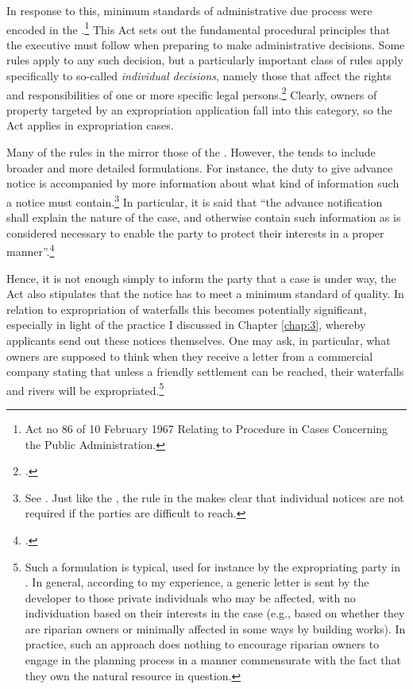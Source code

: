 In response to this, minimum standards of administrative due process were encoded in the \cite{paa67}.\footnote{Act no 86 of 10 February 1967 Relating to Procedure in Cases Concerning the Public Administration.} This Act sets out the fundamental procedural principles that the executive must follow when preparing to make administrative decisions. Some rules apply to any such decision, but a particularly important class of rules apply specifically to so-called {\it individual decisions}, namely those that affect the rights and responsibilities of one or more specific legal persons.\footcite[2]{paa67} Clearly, owners of property targeted by an expropriation application fall into this category, so the Act applies in expropriation cases.

Many of the rules in the \cite{paa67} mirror those of the \cite{ea59}. However, the \cite{paa67} tends to include broader and more detailed formulations. For instance, the duty to give advance notice is accompanied by more information about what kind of information such a notice must contain.\footnote{See \cite[16]{paa67}. Just like the \cite{ea59}, the rule in the \cite{paa67} makes clear that individual notices are not required if the parties are difficult to reach.} In particular, it is said that ``the advance notification shall explain the nature of the case, and otherwise contain such information as is considered necessary to enable the party to protect their interests in a proper manner''.\footcite[16]{paa67} 

Hence, it is not enough simply to inform the party that a case is under way, the Act also stipulates that the notice has to meet a minimum standard of quality. In relation to expropriation of waterfalls this becomes potentially significant, especially in light of the practice I discussed in Chapter \ref{chap:3}, whereby applicants send out these notices themselves. One may ask, in particular, what owners are supposed to think when they receive a letter from a commercial company stating that unless a friendly settlement can be reached, their waterfalls and rivers will be expropriated.\footnote{Such a formulation is typical, used for instance by the expropriating party in \cite{sauda09}. In general, according to my experience, a generic letter is sent by the developer to those private individuals who may be affected, with no individuation based on their interests in the case (e.g., based on whether they are riparian owners or minimally affected in some ways by building works). In practice, such an approach does nothing to encourage riparian owners to engage in the planning process in a manner commensurate with the fact that they own the natural resource in question.}

